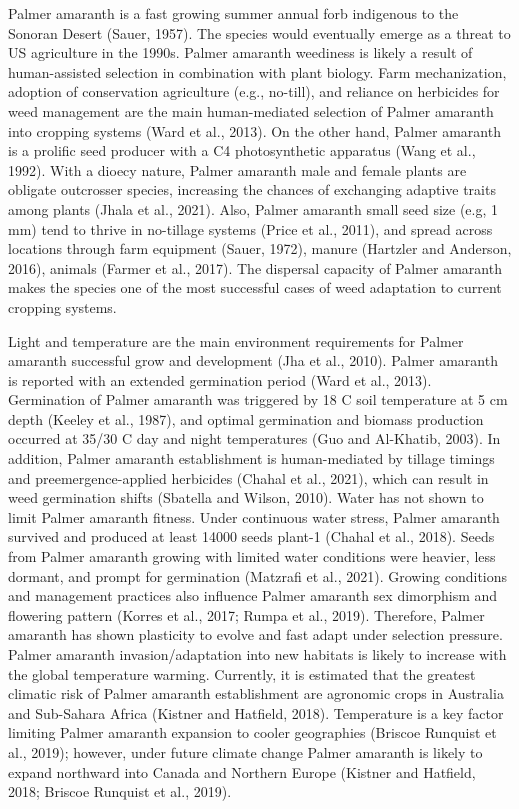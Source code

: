 \documentclass[utf8]{frontiersSCNS}
\begin{document}
Palmer amaranth is a fast growing summer annual forb indigenous to the
Sonoran Desert (Sauer, 1957). The species would eventually emerge as a
threat to US agriculture in the 1990s. Palmer amaranth weediness is
likely a result of human-assisted selection in combination with plant
biology. Farm mechanization, adoption of conservation agriculture (e.g.,
no-till), and reliance on herbicides for weed management are the main
human-mediated selection of Palmer amaranth into cropping systems (Ward
et al., 2013). On the other hand, Palmer amaranth is a prolific seed
producer with a C4 photosynthetic apparatus (Wang et al., 1992). With a
dioecy nature, Palmer amaranth male and female plants are obligate
outcrosser species, increasing the chances of exchanging adaptive traits
among plants (Jhala et al., 2021). Also, Palmer amaranth small seed size
(e.g, 1 mm) tend to thrive in no-tillage systems (Price et al., 2011),
and spread across locations through farm equipment (Sauer, 1972), manure
(Hartzler and Anderson, 2016), animals (Farmer et al., 2017). The
dispersal capacity of Palmer amaranth makes the species one of the most
successful cases of weed adaptation to current cropping systems.

Light and temperature are the main environment requirements for Palmer
amaranth successful grow and development (Jha et al., 2010). Palmer
amaranth is reported with an extended germination period (Ward et al.,
2013). Germination of Palmer amaranth was triggered by 18 C soil
temperature at 5 cm depth (Keeley et al., 1987), and optimal germination
and biomass production occurred at 35/30 C day and night temperatures
(Guo and Al-Khatib, 2003). In addition, Palmer amaranth establishment is
human-mediated by tillage timings and preemergence-applied herbicides
(Chahal et al., 2021), which can result in weed germination shifts
(Sbatella and Wilson, 2010). Water has not shown to limit Palmer
amaranth fitness. Under continuous water stress, Palmer amaranth
survived and produced at least 14000 seeds plant-1 (Chahal et al.,
2018). Seeds from Palmer amaranth growing with limited water conditions
were heavier, less dormant, and prompt for germination (Matzrafi et al.,
2021). Growing conditions and management practices also influence Palmer
amaranth sex dimorphism and flowering pattern (Korres et al., 2017;
Rumpa et al., 2019). Therefore, Palmer amaranth has shown plasticity to
evolve and fast adapt under selection pressure. Palmer amaranth
invasion/adaptation into new habitats is likely to increase with the
global temperature warming. Currently, it is estimated that the greatest
climatic risk of Palmer amaranth establishment are agronomic crops in
Australia and Sub-Sahara Africa (Kistner and Hatfield, 2018).
Temperature is a key factor limiting Palmer amaranth expansion to cooler
geographies (Briscoe Runquist et al., 2019); however, under future
climate change Palmer amaranth is likely to expand northward into Canada
and Northern Europe (Kistner and Hatfield, 2018; Briscoe Runquist et
al., 2019).
\end{document}

